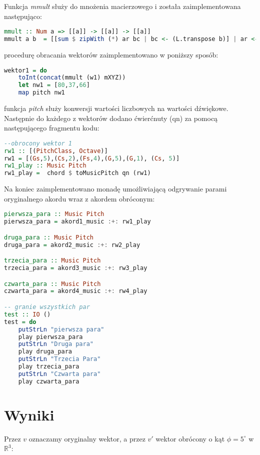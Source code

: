 Funkcja \textit{mmult} służy do mnożenia macierzowego i została zaimplementowana następująco:
\begin{lstlisting}[language = Haskell]
mmult :: Num a => [[a]] -> [[a]] -> [[a]]
mmult a b  = [[sum $ zipWith (*) ar bc | bc <- (L.transpose b)] | ar <- a]
\end{lstlisting}
procedurę obracania wektorów zaimplementowano w poniższy sposób:
\begin{lstlisting}[language = Haskell]
wektor1 = do
    toInt(concat(mmult (w1) mXYZ))
    let nw1 = [80,37,66]
    map pitch nw1
\end{lstlisting}
funkcja \textit{pitch} służy konwersji wartości liczbowych na wartości dźwiękowe.
Następnie do każdego z wektorów dodano ćwierćnuty (qn) za pomocą następującego fragmentu kodu:
\begin{lstlisting}[language = Haskell]
--obrocony wektor 1
rw1 :: [(PitchClass, Octave)]
rw1 = [(Gs,5),(Cs,2),(Fs,4),(G,5),(G,1), (Cs, 5)]
rw1_play :: Music Pitch
rw1_play =  chord $ toMusicPitch qn (rw1)
\end{lstlisting}
Na koniec zaimplementowano monadę umożliwiającą odgrywanie parami oryginalnego akordu wraz z akordem obróconym:

\begin{lstlisting}[language = Haskell]
pierwsza_para :: Music Pitch
pierwsza_para = akord1_music :+: rw1_play

druga_para :: Music Pitch 
druga_para = akord2_music :+: rw2_play

trzecia_para :: Music Pitch 
trzecia_para = akord3_music :+: rw3_play

czwarta_para :: Music Pitch
czwarta_para = akord4_music :+: rw4_play

-- granie wszystkich par
test :: IO ()
test = do
    putStrLn "pierwsza para"
    play pierwsza_para
    putStrLn "Druga para"
    play druga_para
    putStrLn "Trzecia Para"
    play trzecia_para
    putStrLn "Czwarta para"
    play czwarta_para
\end{lstlisting}
    
\section{Wyniki}
Przez $v$ oznaczamy oryginalny wektor, a przez $v'$ wektor obrócony o kąt $\phi = 5^{\circ}$ w $\mathbb{R}^{3}$:

